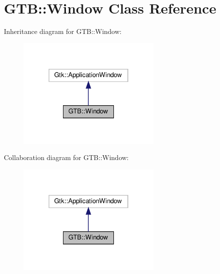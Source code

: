 \hypertarget{a00036}{}\section{G\+TB\+:\+:Window Class Reference}
\label{a00036}


Inheritance diagram for G\+TB\+:\+:Window\+:\nopagebreak
\begin{figure}[H]
\begin{center}
\leavevmode
\includegraphics[width=202pt]{a00035}
\end{center}
\end{figure}


Collaboration diagram for G\+TB\+:\+:Window\+:\nopagebreak
\begin{figure}[H]
\begin{center}
\leavevmode
\includegraphics[width=202pt]{a00034}
\end{center}
\end{figure}
